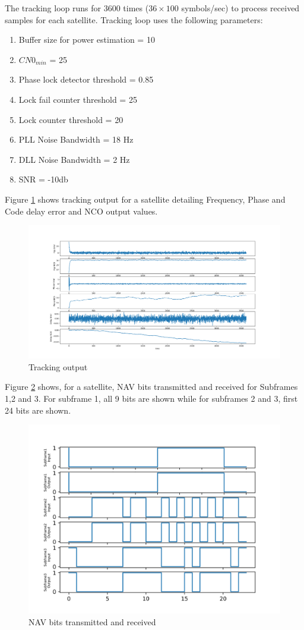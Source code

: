 \documentclass[conference]{IEEEtran}
\begin{document}
The tracking loop runs for 3600 times ($36\times100$ symbols/sec) to process received samples for 
each satellite. Tracking loop uses the following parameters:
\begin{enumerate}
	\item Buffer size for power estimation = 10
	\item  $CN0_{min}$ = 25
	\item Phase lock detector threshold = 0.85
	\item Lock fail counter threshold = 25 
	\item Lock counter threshold = 20
	\item PLL Noise Bandwidth = 18 Hz
	\item DLL Noise Bandwidth = 2 Hz
	\item SNR = -10db
\end{enumerate}
Figure \ref{fig:tracking_output} shows tracking output for a satellite detailing Frequency, Phase and Code delay error and NCO output values.
\begin{figure}[ht]
	\centering
	\includegraphics[width=1\columnwidth]{figs/tracking_output.png}
	\centering
	\caption{Tracking output}
	\label{fig:tracking_output}
\end{figure}

Figure \ref{fig:navbits_output} shows, for a satellite, NAV bits transmitted and received for Subframes 1,2 and 3. 
For subframe 1, all 9 bits are shown while for subframes 2 and 3, first 24 bits are shown.

\begin{figure}[ht]
	\centering
	\includegraphics[width=0.75\columnwidth]{figs/mynavbits.png}
	\centering
	\caption{NAV bits transmitted and received}
	\label{fig:navbits_output}
\end{figure}
\end{document}
